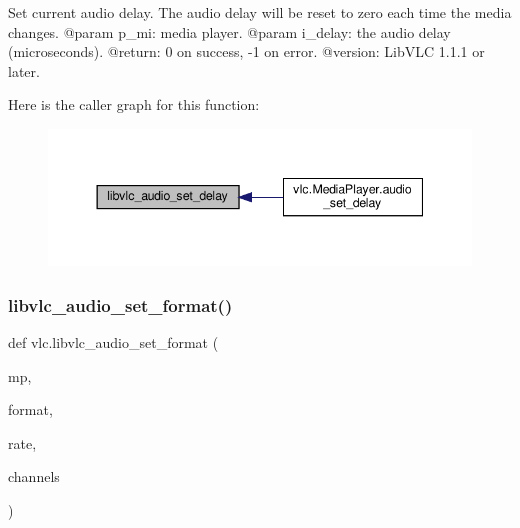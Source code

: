 \begin{DoxyVerb}Set current audio delay. The audio delay will be reset to zero each time the media changes.
@param p_mi: media player.
@param i_delay: the audio delay (microseconds).
@return: 0 on success, -1 on error.
@version: LibVLC 1.1.1 or later.
\end{DoxyVerb}
 Here is the caller graph for this function\+:
\nopagebreak
\begin{figure}[H]
\begin{center}
\leavevmode
\includegraphics[width=344pt]{namespacevlc_a4f69c99e5eaf09175dd4353d56e934d8_icgraph}
\end{center}
\end{figure}
\mbox{\label{namespacevlc_ab91a179094998e8bf3c5be9ab109e206}} 
\subsubsection{\texorpdfstring{libvlc\+\_\+audio\+\_\+set\+\_\+format()}{libvlc\_audio\_set\_format()}}
{\footnotesize\ttfamily def vlc.\+libvlc\+\_\+audio\+\_\+set\+\_\+format (\begin{DoxyParamCaption}\item[{}]{mp,  }\item[{}]{format,  }\item[{}]{rate,  }\item[{}]{channels }\end{DoxyParamCaption})}

